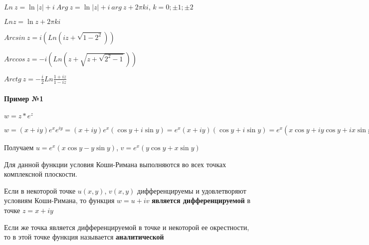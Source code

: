 \documentclass{article}
\begin{document}
$Ln \ z = \ln |z| + i \ Arg \ z = \ln |z| + i \ arg \ z + 2 \pi k i$, $k = 0; \pm 1; \pm 2$

$Ln z = \ln z + 2 \pi k i$

\hfill

$Arcsin \ z = i (Ln (i z + \sqrt{1 - 2^2}))$

$Arccos \ z = - i (Ln (z + \sqrt{z + \sqrt{2^2 - 1}}))$

$Arctg \ z = - \frac{i}{2} Ln \frac{1 + i z}{1 - iz}$

\paragraph{Пример №1}

$w = z * e^{z}$

$w  = (x + i y) e^{x} e^{i y} = (x + i y) e^{x} (\cos y + i \sin y) = e^{x} (x + i y)(\cos y + i \sin y) = e^{x} (x \cos y + i y \cos y + i x \sin y + i^{2} y \sin y) = e^{x} (x \cos y - y \sin y) + i e^{x} (y \cos y + x \sin y)$

Получаем $u = e^{x} (x \cos y - y \sin y)$, $v = e^{x} (y \cos y + x \sin y)$

\hfill

\begin{multienumerate}
\end{multienumerate}

Для данной функции условия Коши-Римана выполняются во всех точках комплексной плоскости.

\hfill

Если в некоторой точке $u (x, y)$, $v (x, y)$ дифференцируемы и удовлетворяют условиям Коши-Римана, то функция $w = u + i v$ \textbf{является дифференцируемой} в точке $z = x + i y$

Если же точка является дифференцируемой в точке и некоторой ее окрестности, то в этой точке функция называется \textbf{аналитической}
\end{document}
